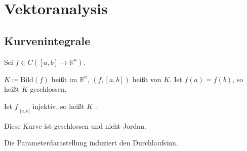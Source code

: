 \documentclass[a4paper,10pt]{scrbook}
\begin{document}
%
%

\setcounter{thmn}{0}
\chapter{Vektoranalysis}

%
%

\section{Kurvenintegrale}
\addtocounter{thmn}{1}
\setcounter{theorem}{0}


\begin{theorem}[Definition]
  Sei $f \in C([a,b] \to \mathbb{R}^n)$.
  \begin{enum-arab}
    \item $K \coloneq \mathrm{Bild}(f)$ heißt  im $\mathbb{R}^n$, $(f,[a,b])$ heißt  von $K$. Ist $f(a) = f(b)$, so heißt $K$ geschlossen.

    \item Ist $f\Big|_{[a,b[}$ injektiv, so heißt $K$ .
  \end{enum-arab}
  \begin{figure}[H]
    \centering
  \end{figure}
  Diese Kurve ist geschlossen und nicht Jordan.
\end{theorem}

\begin{notice}
  Die Parameterdarastellung induziert den Durchlaufsinn.
\end{notice}
\end{document}
